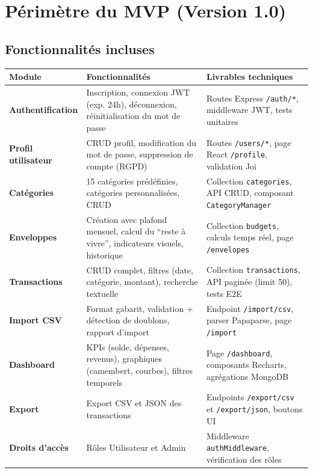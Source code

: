 \section{Périmètre du MVP (Version 1.0)}

\subsection{Fonctionnalités incluses}

\begin{center}
\small
\begin{tabular}{|p{2.5cm}|p{5.5cm}|p{5.5cm}|}
\hline
\textbf{Module} & \textbf{Fonctionnalités} & \textbf{Livrables techniques} \\
\hline
\textbf{Authentification} & Inscription, connexion JWT (exp. 24h), déconnexion, réinitialisation du mot de passe & Routes Express \texttt{/auth/*}, middleware JWT, tests unitaires \\
\hline
\textbf{Profil utilisateur} & CRUD profil, modification du mot de passe, suppression de compte (RGPD) & Routes \texttt{/users/*}, page React \texttt{/profile}, validation Joi \\
\hline
\textbf{Catégories} & 15 catégories prédéfinies, catégories personnalisées, CRUD & Collection \texttt{categories}, API CRUD, composant \texttt{CategoryManager} \\
\hline
\textbf{Enveloppes} & Création avec plafond mensuel, calcul du ``reste à vivre'', indicateurs visuels, historique & Collection \texttt{budgets}, calculs temps réel, page \texttt{/envelopes} \\
\hline
\textbf{Transactions} & CRUD complet, filtres (date, catégorie, montant), recherche textuelle & Collection \texttt{transactions}, API paginée (limit 50), tests E2E \\
\hline
\textbf{Import CSV} & Format gabarit, validation + détection de doublons, rapport d'import & Endpoint \texttt{/import/csv}, parser Papaparse, page \texttt{/import} \\
\hline
\textbf{Dashboard} & KPIs (solde, dépenses, revenus), graphiques (camembert, courbes), filtres temporels & Page \texttt{/dashboard}, composants Recharts, agrégations MongoDB \\
\hline
\textbf{Export} & Export CSV et JSON des transactions & Endpoints \texttt{/export/csv} et \texttt{/export/json}, boutons UI \\
\hline
\textbf{Droits d'accès} & Rôles Utilisateur et Admin & Middleware \texttt{authMiddleware}, vérification des rôles \\
\hline
\end{tabular}
\end{center}

